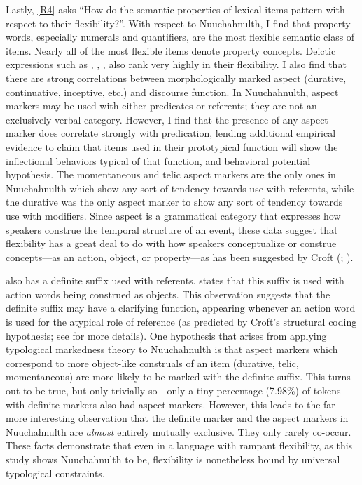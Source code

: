 Lastly, \ref{R4} asks \enquote{How do the semantic properties of lexical items pattern with respect to their flexibility?}. With respect to Nuuchahnulth, I find that property words, especially numerals and quantifiers, are the most flexible semantic class of items. Nearly all of the most flexible items denote property concepts. Deictic expressions such as , , ,  also rank very highly in their flexibility. I also find that there are strong correlations between morphologically marked aspect (durative, continuative, inceptive, etc.) and discourse function. In Nuuchahnulth, aspect markers may be used with either predicates or referents; they are not an exclusively verbal category. However, I find that the presence of any aspect marker does correlate strongly with predication, lending additional empirical evidence to  claim that items used in their prototypical function will show the inflectional behaviors typical of that function, and  behavioral potential hypothesis. The momentaneous and telic aspect markers are the only ones in Nuuchahnulth which show any sort of tendency towards use with referents, while the durative was the only aspect marker to show any sort of tendency towards use with modifiers. Since aspect is a grammatical category that expresses how speakers construe the temporal structure of an event, these data suggest that flexibility has a great deal to do with how speakers conceptualize or construe concepts—as an action, object, or property—as has been suggested by Croft (\citeyear[99]{Croft1991}; \citeyear[104]{Croft2001b}).

 also has a definite suffix  used with referents. \textcite[48]{Nakayama2001} states that this suffix is used with action words being construed as objects. This observation suggests that the definite suffix may have a clarifying function, appearing whenever an action word is used for the atypical role of reference (as predicted by Croft's structural coding hypothesis; see  for more details). One hypothesis that arises from applying typological markedness theory to Nuuchahnulth is that aspect markers which correspond to more object-like construals of an item (durative, telic, momentaneous) are more likely to be marked with the definite suffix. This turns out to be true, but only trivially so—only a tiny percentage (7.98\%) of tokens with definite markers also had aspect markers. However, this leads to the far more interesting observation that the definite marker and the aspect markers in Nuuchahnulth are \emph{almost} entirely mutually exclusive. They only rarely co-occur. These facts demonstrate that even in a language with rampant flexibility, as this study shows Nuuchahnulth to be, flexibility is nonetheless bound by universal typological constraints.


